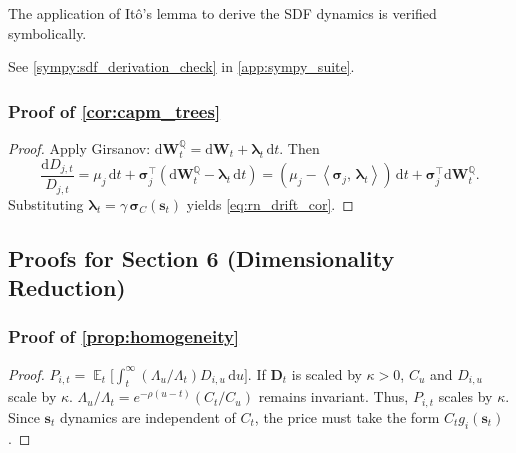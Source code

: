 \documentclass[11pt,letterpaper,oneside]{article}
\numberwithin{equation}{section}
\DeclareMathOperator{\E}{\mathbb{E}}
\newcommand{\1}{\mathbf{1}}
\newcommand{\diff}{\mathrm{d}}
\newcommand{\ip}[2]{\left\langle #1,\,#2\right\rangle}
\begin{document}
\begin{sympycheck}[title={Verification: It\^o's Lemma for the SDF (\cref{prop:sdf})}]\label{sympy:sdf_derivation}
The application of It\^o's lemma to derive the SDF dynamics is verified symbolically.

See \cref{sympy:sdf_derivation_check} in \cref{app:sympy_suite}.\end{sympycheck}


\subsubsection{Proof of \cref{cor:capm_trees}}\label{app:proof:cor:capm_trees}
\begin{proof}
Apply Girsanov: $\diff\bm{W}_t^{\mathbb{Q}}=\diff\bm{W}_t+\bm{\lambda}_t\,\diff t$. Then
\[
  \frac{\diff D_{j,t}}{D_{j,t}}=\mu_j\,\diff t+\bm{\sigma}_j^{\top}(\diff\bm{W}_t^{\mathbb{Q}}-\bm{\lambda}_t\,\diff t)
  = (\mu_j-\ip{\bm{\sigma}_j}{\bm{\lambda}_t})\,\diff t + \bm{\sigma}_j^{\top}\diff\bm{W}_t^{\mathbb{Q}}.
\]
Substituting $\bm{\lambda}_t=\gamma\,\bm{\sigma}_C(\bm{s}_t)$ yields \eqref{eq:rn_drift_cor}.
\end{proof}

\subsection{Proofs for Section 6 (Dimensionality Reduction)}

\subsubsection{Proof of \cref{prop:homogeneity}}\label{app:proof:prop:homogeneity}
\begin{proof}
$P_{i,t} = \E_t\big[\int_t^\infty (\Lambda_u/\Lambda_t) D_{i,u}\,\diff u\big]$. If $\bm{D}_t$ is scaled by $\kappa>0$, $C_u$ and $D_{i,u}$ scale by $\kappa$. $\Lambda_u/\Lambda_t = e^{-\rho(u-t)} (C_t/C_u)$ remains invariant. Thus, $P_{i,t}$ scales by $\kappa$. Since $\bm{s}_t$ dynamics are independent of $C_t$, the price must take the form $C_t g_i(\bm{s}_t)$.
\end{proof}
\end{document}

